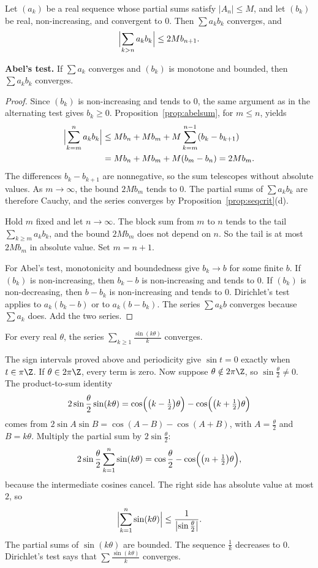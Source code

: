 \begin{theorem}\label{thm:dirichlettest}
Let $(a_k)$ be a real sequence whose partial sums satisfy $|A_n|\le M$, and let $(b_k)$ be real, non-increasing, and convergent to $0$. Then $\sum a_kb_k$ converges, and
\[
\Bigl|\sum_{k>n}a_kb_k\Bigr|\le2Mb_{n+1}.
\]

\textbf{Abel's test.} If $\sum a_k$ converges and $(b_k)$ is monotone and bounded, then $\sum a_kb_k$ converges.
\end{theorem}
\begin{proof}
Since $(b_k)$ is non-increasing and tends to $0$, the same argument as in the alternating test gives $b_k\ge0$. Proposition~\ref{prop:abelsum}, for $m\le n$, yields
\begin{align*}
\Bigl|\sum_{k=m}^n a_kb_k\Bigr|
&\le Mb_n+Mb_m+M\sum_{k=m}^{n-1}(b_k-b_{k+1})\\
&=Mb_n+Mb_m+M(b_m-b_n)=2Mb_m.
\end{align*}
The differences $b_k-b_{k+1}$ are nonnegative, so the sum telescopes without absolute values. As $m\to\infty$, the bound $2Mb_m$ tends to $0$. The partial sums of $\sum a_kb_k$ are therefore Cauchy, and the series converges by Proposition~\ref{prop:seqcrit}(d).

Hold $m$ fixed and let $n\to\infty$. The block sum from $m$ to $n$ tends to the tail $\sum_{k\ge m}a_kb_k$, and the bound $2Mb_m$ does not depend on $n$. So the tail is at most $2Mb_m$ in absolute value. Set $m=n+1$.

For Abel's test, monotonicity and boundedness give $b_k\to b$ for some finite $b$. If $(b_k)$ is non-increasing, then $b_k-b$ is non-increasing and tends to $0$. If $(b_k)$ is non-decreasing, then $b-b_k$ is non-increasing and tends to $0$. Dirichlet's test applies to $a_k(b_k-b)$ or to $a_k(b-b_k)$. The series $\sum a_kb$ converges because $\sum a_k$ does. Add the two series.
\end{proof}

\begin{examplex}
For every real $\theta$, the series $\sum_{k\ge1}\frac{\sin(k\theta)}k$ converges.
\end{examplex}

The sign intervals proved above and periodicity give $\sin t=0$ exactly when $t\in\pi\Z$. If $\theta\in2\pi\Z$, every term is zero. Now suppose $\theta\notin2\pi\Z$, so $\sin\frac\theta2\ne0$. The product-to-sum identity
\[
2\sin\frac\theta2\sin(k\theta)=\cos\Bigl(\bigl(k-\tfrac12\bigr)\theta\Bigr)-\cos\Bigl(\bigl(k+\tfrac12\bigr)\theta\Bigr)
\]
comes from $2\sin A\sin B=\cos(A-B)-\cos(A+B)$, with $A=\frac\theta2$ and $B=k\theta$. Multiply the partial sum by $2\sin\frac\theta2$:
\[
2\sin\frac\theta2\sum_{k=1}^n\sin(k\theta)=\cos\frac\theta2-\cos\Bigl(\bigl(n+\tfrac12\bigr)\theta\Bigr),
\]
because the intermediate cosines cancel. The right side has absolute value at most $2$, so
\[
\Bigl|\sum_{k=1}^n\sin(k\theta)\Bigr|\le\frac1{\bigl|\sin\frac\theta2\bigr|}.
\]
The partial sums of $\sin(k\theta)$ are bounded. The sequence $\frac1k$ decreases to $0$. Dirichlet's test says that $\sum\frac{\sin(k\theta)}k$ converges.

